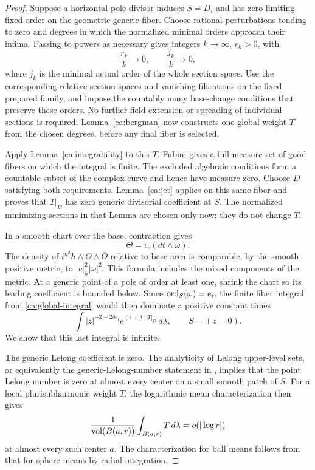 \begin{proof}
Suppose a horizontal pole divisor induces \(S=D_i\) and has
zero limiting fixed order on the geometric generic fiber.  Choose
rational perturbations tending to zero and degrees in which the
normalized minimal orders approach their infima.  Passing to powers
as necessary gives integers
\(k\to\infty\), \(r_k>0\), with
\[
 \frac{r_k}{k}\longrightarrow0,
 \qquad \frac{j_k}{k}\longrightarrow0,
\]
where \(j_k\) is the minimal actual order of the whole section
space.  Use the corresponding relative section spaces and vanishing
filtrations on the fixed prepared family, and impose the countably many
base-change conditions that preserve these orders.  No further field
extension or spreading of individual sections is required.
Lemma~\ref{ca:bergman} now constructs one global weight $T$ from the
chosen degrees, before any final fiber is selected.

Apply Lemma~\ref{ca:integrability} to this $T$.  Fubini gives a
full-measure set of good fibers on which the integral is finite.
The excluded algebraic conditions form a countable subset of the
complex curve and hence have measure zero.  Choose $D$ satisfying
both requirements.  Lemma~\ref{ca:jet} applies on this same fiber
and proves that $T|_D$ has zero generic divisorial coefficient at $S$.
The normalized minimizing sections in that Lemma are chosen only now;
they do not change $T$.

In a smooth chart over the base, contraction gives
\[
 \Theta=\iota_v(dt\wedge\omega).
\]
The density of \(i^{n^2}h\wedge\Theta\wedge\overline\Theta\)
relative to base area is comparable, by the smooth positive metric,
to \(|v|_h^2|\omega|^2\).  This formula includes the mixed
components of the metric.  At a generic point of a pole of order
at least one, shrink the chart so its leading coefficient is
bounded below.  Since \(\operatorname{ord}_S(\omega)=e_i\), the finite fiber
integral from \eqref{ca:global-integral} would then dominate a
positive constant times
\begin{equation}\label{ca:pole-integral}
 \int |z|^{-2-2\delta e_i}e^{(1+\delta)T|_D}\,d\lambda,
 \qquad S=(z=0).
\end{equation}
We show that this last integral is infinite.

The generic Lelong coefficient is zero.  The analyticity of Lelong
upper-level sets, or equivalently the generic-Lelong-number
statement in \cite[Chapter~III, Lemma~8.15]{DemaillyCADG}, implies
that the point Lelong number is zero at almost every center on a
small smooth patch of \(S\).  For a local plurisubharmonic weight
\(T\), the logarithmic mean characterization
\cite[Chapter~III, Corollary~6.8 and Example~6.9]{DemaillyCADG}
then gives
\[
 \frac{1}{\operatorname{vol}(B(a,r))}\int_{B(a,r)}T\,d\lambda
                   =o(|\log r|)
\]
at almost every such center \(a\).  The characterization for ball
means follows from that for sphere means by radial integration.


\end{proof}
